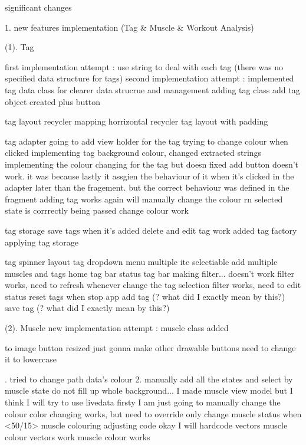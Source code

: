 
significant changes 

1. new features implementation (Tag & Muscle & Workout Analysis)

(1). Tag

first implementation attempt : use string to deal with each tag (there was no specified data structure for tags)
second implementation attempt : implemented tag data class for clearer data strucrue and management 
    adding tag class
    add tag object created
    plus button

\view
tag layout
recycler mapping
horrizontal recycler
tag layout with padding

\viewModel
tag adapter
going to add view holder for the tag
trying to change colour when clicked
implementing tag background colour, changed extracted strings
implementing the colour changing for the tag but doesn
fixed add button doesn't work. it was because lastly it assgien the behaviour of it when it's clicked in the adapter later than the fragement. but the correct behaviour was defined in the fragment
adding tag works again
will manually change the colour rn
selected state is corrrectly being passed
change colour work

\model
tag storage
save tags when it's added
delete and edit tag work
added tag factory
applying tag storage

\addCardActivity
tag spinner layout 
tag dropdown menu
    multiple ite selectiable
    add multiple muscles and tags
\homeFragment
home tag bar
\statusFragment
status tag bar
    making filter... doesn't work
    filter works, need to refresh whenever change the tag selection
    filter works, need to edit status
    reset tags when stop app
    add tag (? what did I exactly mean by this?)
    save tag (? what did I exactly mean by this?)


(2). Muscle
new implementation attempt : muscle class added

\view
to image button
resized
just gonna make other drawable buttons
need to change it to lowercase

. tried to change path data's colour
2. manually add all the states and select by muscle state
do not fill up whole background...
I made muscle view model but I think I will try to use livedata firsty
I am just going to manually change the colour
color changing works, but need to override
only change muscle status when <50/15>
muscle colouring
adjusting code
okay I will hardcode
vectors
muscle colour vectors
work
muscle colour works

